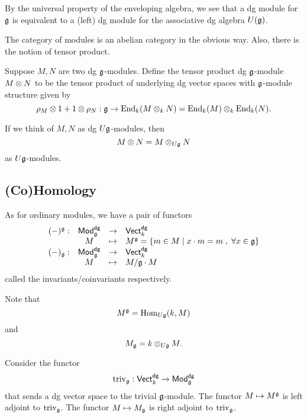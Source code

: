 \documentclass[11pt]{amsart}
\def\dgVect{{\sf Vect}^{\sf dg}}
\def\dgMod{{\sf Mod}^{\sf dg}}
\begin{document}
\begin{rmk}
By the universal property of the enveloping algebra, we see that a dg module for $\mathfrak g$ is equivalent to a (left) dg module for the associative dg algebra $U(\mathfrak g)$. 
\end{rmk}

The category of modules is an abelian category in the obvious way. 
Also, there is the notion of tensor product. 

\begin{dfn}
Suppose $M,N$ are two dg $\mathfrak g$-modules.
Define the tensor product dg $\mathfrak g$-module $M \otimes N$ to be the tensor product of underlying dg vector spaces with $\mathfrak g$-module structure given by
\[
\rho_{M} \otimes 1 + 1 \otimes \rho_N : \mathfrak g \to {\rm End}_k(M \otimes_k N) = {\rm End}_k(M) \otimes_k {\rm End}_k(N) .
\]
\end{dfn}

\begin{rmk}
If we think of $M,N$ as dg $U\mathfrak g$-modules, then 
\[
M \otimes N = M \otimes_{U\mathfrak g} N
\]
as $U \mathfrak g$-modules. 
\end{rmk}

\subsection{(Co)Homology}

As for ordinary modules, we have a pair of functors
\[
\begin{array}{cccl}
(-)^\fg : & \dgMod_\fg & \to & \dgVect_k  \\
& M & \mapsto & M^\fg = \{m \in M \; | \; x \cdot m = m \; , \; \forall x \in \fg\} \\
(-)_{\fg} : & \dgMod_{\fg} & \to & \dgVect_k \\
& M & \mapsto & M / \fg \cdot M 
\end{array}
\]
called the invariants/coinvariants respectively. 

\begin{rmk}
Note that 
\[
M^\mathfrak g = {\rm Hom}_{U \mathfrak g}(k, M)
\]
and 
\[
M_\mathfrak g = k \otimes_{U \mathfrak g} M .
\] 
\end{rmk}

\begin{lem}
Consider the functor
\[
{\rm triv}_\fg : \dgVect_k \to \dgMod_\fg
\]
that sends a dg vector space to the trivial $\mathfrak g$-module.
The functor $M \mapsto M^\mathfrak g$ is left adjoint to ${\rm triv}_\mathfrak g$. 
The functor $M \mapsto M_\mathfrak g$ is right adjoint to ${\rm triv}_\mathfrak g$. 
\end{lem}
\end{document}
